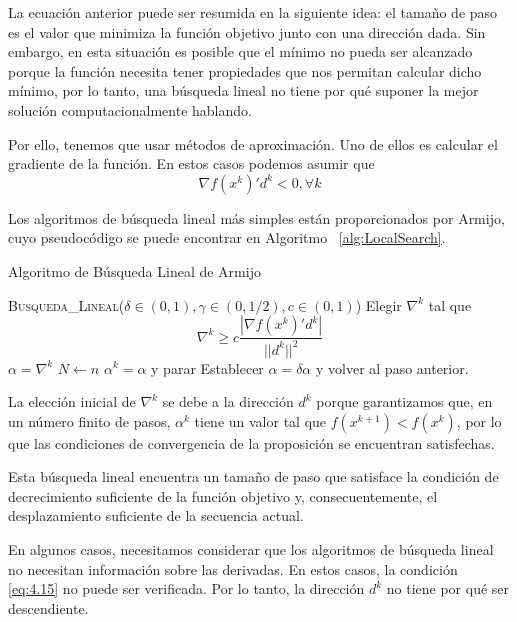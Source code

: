 La ecuación anterior puede ser resumida en la siguiente idea: 
el tamaño de paso es el valor que minimiza la función objetivo junto con una dirección dada. 
Sin embargo, en esta situación es posible que el mínimo no pueda ser alcanzado porque la función necesita tener propiedades que nos permitan calcular dicho mínimo, por lo tanto, una búsqueda lineal no tiene por qué suponer la mejor solución computacionalmente hablando.

Por ello, tenemos que usar métodos de aproximación. 
Uno de ellos es calcular el gradiente de la función. 
En estos casos podemos asumir que
\begin{equation}
\nabla f(x^k)'d^k < 0, \forall k
\label{eq:4.15}
\end{equation}

Los algoritmos de búsqueda lineal más simples están proporcionados por Armijo, cuyo pseudocódigo se puede encontrar en Algoritmo ~\ref{alg:LocalSearch}.

\begin{algorithm}
\caption{Algoritmo de Búsqueda Lineal de Armijo}\label{alg:LocalSearch}
\begin{algorithmic}[1]
\Procedure \textsc{Busqueda\_Lineal}($\delta\in (0,1), \gamma\in (0,1/2), c\in (0,1)$)
\State Elegir $\nabla^k$ tal que\begin{equation*}
\nabla^k \geq c \dfrac{|\nabla f(x^k)'d^k|}{||d^k||^2}
\end{equation*}
\State $\alpha = \nabla^k$
\State $N \gets n$
    \State $\alpha^k = \alpha$ y parar
\Else
    \State Establecer $\alpha = \delta\alpha$ y volver al paso anterior.
\EndIf
\EndProcedure
\end{algorithmic}
\end{algorithm}

La elección inicial de $\nabla^k$ se debe a la dirección $d^k$ porque garantizamos que, en un número finito de pasos, $\alpha^k$ tiene un valor tal que $f(x^{k+1})<f(x^k)$, por lo que las condiciones de convergencia de la proposición se encuentran satisfechas.

Esta búsqueda lineal encuentra un tamaño de paso que satisface la condición de decrecimiento suficiente de la función objetivo y, consecuentemente, el desplazamiento suficiente de la secuencia actual.

En algunos casos, necesitamos considerar que los algoritmos de búsqueda lineal no necesitan información sobre las derivadas. 
En estos casos, la condición \ref{eq:4.15} no puede ser verificada. 
Por lo tanto, la dirección $d^k$ no tiene por qué ser descendiente. 

